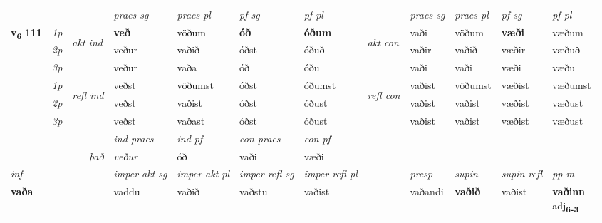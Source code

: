 \begin{longtable}[l]{X>{\footnotesize\itshape}llXXXXlXXXX}
\midrule

 & &   & \textit{praes sg}  & \textit{praes pl}    & \textit{ pf sg} & \textit{pf pl} & & \textit{praes sg}  & \textit{praes pl}    & \textit{pf sg} & \textit{pf pl }  \\ \cmidrule{4-7} \cmidrule{9-12}
 \multirow{2}{*}{{{\textbf{v{\textsubscript{6}}} \Large{\textbf{111}}}}}  & 1p & \multirow{3}{*}{\begin{turn}{90}\textit{akt ind}\end{turn}} & \textbf{veð} & vöðum & \textbf{óð} & \textbf{óðum} & \multirow{3}{*}{\begin{turn}{90}\textit{akt con}\end{turn}} &vaði & vöðum & \textbf{væði} & væðum\\*
 & 2p &  &  veður  & vaðið & óðst & óðuð & & vaðir & vaðið & væðir & væðuð \\*
 & 3p &  & veður & vaða & óð & óðu & & vaði & vaði& væði & væðu \\*
\cmidrule{4-7} \cmidrule{9-12}
 & 1p & \multirow{3}{*}{\begin{turn}{90}\textit{refl ind}\end{turn}}  & veðst & vöðumst & óðst & óðumst & \multirow{3}{*}{\begin{turn}{90}\textit{refl con}\end{turn}}  &vaðist & vöðumst & væðist & væðumst \\*
 & 2p &  & veðst & vaðist & óðst & óðust & &vaðist & vaðist & væðist & væðust \\*
 & 3p  & & veðst & vaðast & óðst & óðust & & vaðist & vaðist& væðist & væðust \\*
\cmidrule{4-7} \cmidrule{9-12}

   && &  \textit{ind praes} & \textit{ind pf} & \textit{con praes} & \textit{con pf} \\*
\multicolumn{3}{r}{\textit{það}} & veður & óð & vaði & væði \\*

\cmidrule{4-7}
   {\textit{inf}} & &  & \textit{imper akt sg} & \textit{imper akt pl} & \textit{imper refl sg} & \textit{imper refl pl} && \textit{presp} & \textit{supin} & \textit{supin refl} & \textit{pp m} \\*
  {\textbf{vaða}} & && vaddu  & vaðið & vaðstu & vaðist && vaðandi &  \textbf{vaðið} & vaðist & \specialcell{\textbf{vaðinn} \\ adj\textbf{\textsubscript{6-3}}} \\*

\midrule


\end{longtable}

